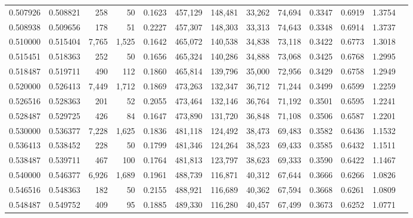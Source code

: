\begin{tabular}{rrrrrrrrrrrrr}
0.507926 & 0.508821 &    258 &    50 &                                     0.1623 & 457,129 & 148,481 &  33,262 &  74,694 & 0.3347 & 0.6919 & 1.3754 \\
0.508938 & 0.509656 &    178 &    51 &                                     0.2227 & 457,307 & 148,303 &  33,313 &  74,643 & 0.3348 & 0.6914 & 1.3737 \\
0.510000 & 0.515404 &  7,765 & 1,525 &                                     0.1642 & 465,072 & 140,538 &  34,838 &  73,118 & 0.3422 & 0.6773 & 1.3018 \\
0.515451 & 0.518363 &    252 &    50 &                                     0.1656 & 465,324 & 140,286 &  34,888 &  73,068 & 0.3425 & 0.6768 & 1.2995 \\
0.518487 & 0.519711 &    490 &   112 &                                     0.1860 & 465,814 & 139,796 &  35,000 &  72,956 & 0.3429 & 0.6758 & 1.2949 \\
0.520000 & 0.526413 &  7,449 & 1,712 &                                     0.1869 & 473,263 & 132,347 &  36,712 &  71,244 & 0.3499 & 0.6599 & 1.2259 \\
0.526516 & 0.528363 &    201 &    52 &                                     0.2055 & 473,464 & 132,146 &  36,764 &  71,192 & 0.3501 & 0.6595 & 1.2241 \\
0.528487 & 0.529725 &    426 &    84 &                                     0.1647 & 473,890 & 131,720 &  36,848 &  71,108 & 0.3506 & 0.6587 & 1.2201 \\
0.530000 & 0.536377 &  7,228 & 1,625 &                                     0.1836 & 481,118 & 124,492 &  38,473 &  69,483 & 0.3582 & 0.6436 & 1.1532 \\
0.536413 & 0.538452 &    228 &    50 &                                     0.1799 & 481,346 & 124,264 &  38,523 &  69,433 & 0.3585 & 0.6432 & 1.1511 \\
0.538487 & 0.539711 &    467 &   100 &                                     0.1764 & 481,813 & 123,797 &  38,623 &  69,333 & 0.3590 & 0.6422 & 1.1467 \\
0.540000 & 0.546377 &  6,926 & 1,689 &                                     0.1961 & 488,739 & 116,871 &  40,312 &  67,644 & 0.3666 & 0.6266 & 1.0826 \\
0.546516 & 0.548363 &    182 &    50 &                                     0.2155 & 488,921 & 116,689 &  40,362 &  67,594 & 0.3668 & 0.6261 & 1.0809 \\
0.548487 & 0.549752 &    409 &    95 &                                     0.1885 & 489,330 & 116,280 &  40,457 &  67,499 & 0.3673 & 0.6252 & 1.0771 \\

\end{tabular}
